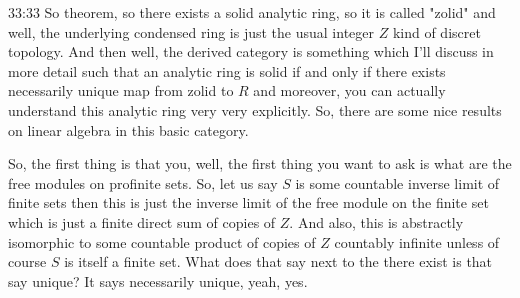 \begin{unfinished}{33:33}
So theorem, so there exists a solid analytic ring, so it is called "zolid" and well, the underlying condensed ring is just the usual integer $Z$ kind of discret topology. And then well, the derived category is something which I'll discuss in more detail such that an analytic ring is solid if and only if there exists necessarily unique map from zolid to $R$ and moreover, you can actually understand this analytic ring very very explicitly. So, there are some nice results on linear algebra in this basic category.

So, the first thing is that you, well, the first thing you want to ask is what are the free modules on profinite sets. So, let us say $S$ is some countable inverse limit of finite sets then this is just the inverse limit of the free module on the finite set which is just a finite direct sum of copies of $Z$. And also, this is abstractly isomorphic to some countable product of copies of $Z$ countably infinite unless of course $S$ is itself a finite set. What does that say next to the there exist is that say unique? It says necessarily unique, yeah, yes. 


\end{unfinished}
